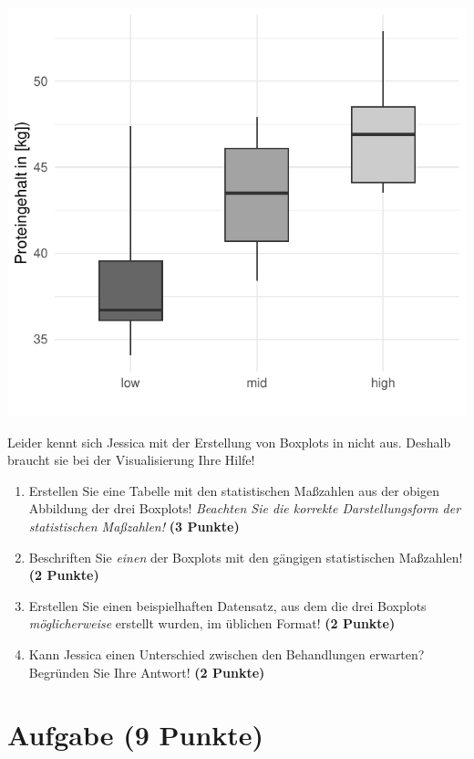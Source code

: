 \documentclass[a4paper, 9pt]{scrartcl}\usepackage[]{graphicx}\usepackage[]{xcolor}
\makeatletter
\def\maxwidth{ %
  \ifdim\Gin@nat@width>\linewidth
    \linewidth
  \else
    \Gin@nat@width
  \fi
}
\makeatother
\begin{document}
{\centering \includegraphics[width=\maxwidth]{img/boxplot-02-zer-1} 

}




Leider kennt sich Jessica mit der Erstellung von Boxplots in \Rlogo nicht aus. Deshalb braucht sie bei der Visualisierung Ihre Hilfe!

\begin{enumerate}
\item Erstellen Sie eine Tabelle mit den statistischen Maßzahlen aus der obigen Abbildung der drei Boxplots! \textit{Beachten Sie die korrekte Darstellungsform der statistischen Maßzahlen!} \textbf{(3 Punkte)}
\item Beschriften Sie \textit{einen} der Boxplots mit den gängigen statistischen Maßzahlen! \textbf{(2 Punkte)}
\item Erstellen Sie einen beispielhaften Datensatz, aus dem die drei Boxplots \textit{möglicherweise} erstellt wurden, im \Rlogo üblichen Format! \textbf{(2 Punkte)}
\item Kann Jessica einen Unterschied zwischen den Behandlungen erwarten? Begründen Sie Ihre Antwort! \textbf{(2 Punkte)}
\end{enumerate} 
\clearpage

\section{Aufgabe \hfill (9 Punkte)}
\end{document}
